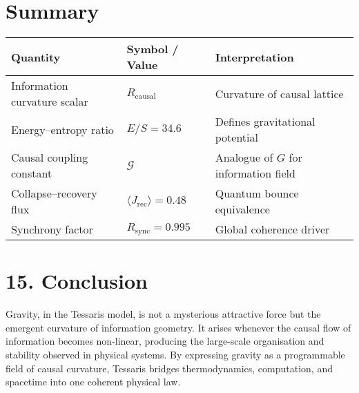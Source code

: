 \documentclass[11pt,a4paper]{article}
\begin{document}
\section*{Summary}
\begin{longtable}{|l|l|l|}
\hline
\textbf{Quantity} & \textbf{Symbol / Value} & \textbf{Interpretation} \\
\hline
Information curvature scalar & $R_{\mathrm{causal}}$ & Curvature of causal lattice \\
Energy--entropy ratio & $E/S = 34.6$ & Defines gravitational potential \\
Causal coupling constant & $\mathcal{G}$ & Analogue of $G$ for information field \\
Collapse--recovery flux & $\langle J_{\mathrm{rec}}\rangle = 0.48$ & Quantum bounce equivalence \\
Synchrony factor & $R_{\mathrm{sync}}=0.995$ & Global coherence driver \\
\hline
\end{longtable}

\section{15. Conclusion}
Gravity, in the Tessaris model, is not a mysterious attractive force but the emergent curvature of information geometry.  
It arises whenever the causal flow of information becomes non-linear, producing the large-scale organisation and stability observed in physical systems.  
By expressing gravity as a programmable field of causal curvature, Tessaris bridges thermodynamics, computation, and spacetime into one coherent physical law.
\end{document}
